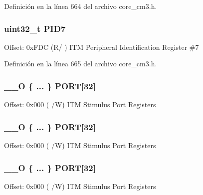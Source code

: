 Definición en la línea 664 del archivo core\+\_\+cm3.\+h.

\subsubsection[{\texorpdfstring{P\+I\+D7}{PID7}}]{ uint32\+\_\+t P\+I\+D7}\hypertarget{struct_i_t_m___type_a247fae2f4a140d4da5e8a044370dedec}{}\label{struct_i_t_m___type_a247fae2f4a140d4da5e8a044370dedec}
Offset\+: 0x\+F\+DC (R/ ) I\+TM Peripheral Identification Register \#7 

Definición en la línea 665 del archivo core\+\_\+cm3.\+h.

\subsubsection[{\texorpdfstring{P\+O\+RT}{PORT}}]{\setlength{\rightskip}{0pt plus 5cm}\+\_\+\+\_\+O \{ ... \}    P\+O\+RT\mbox{[}32\mbox{]}}\hypertarget{struct_i_t_m___type_aa6d310cc8eabd3413456ed2c6d28435e}{}\label{struct_i_t_m___type_aa6d310cc8eabd3413456ed2c6d28435e}
Offset\+: 0x000 ( /W) I\+TM Stimulus Port Registers 
\subsubsection[{\texorpdfstring{P\+O\+RT}{PORT}}]{\setlength{\rightskip}{0pt plus 5cm}\+\_\+\+\_\+O \{ ... \}    P\+O\+RT\mbox{[}32\mbox{]}}\hypertarget{struct_i_t_m___type_a85a40c43c0c3a77535a31a0aefc0fe76}{}\label{struct_i_t_m___type_a85a40c43c0c3a77535a31a0aefc0fe76}
Offset\+: 0x000 ( /W) I\+TM Stimulus Port Registers 
\subsubsection[{\texorpdfstring{P\+O\+RT}{PORT}}]{\setlength{\rightskip}{0pt plus 5cm}\+\_\+\+\_\+O \{ ... \}    P\+O\+RT\mbox{[}32\mbox{]}}\hypertarget{struct_i_t_m___type_a4fb8d5beccf8bf958357bf9d59856f05}{}\label{struct_i_t_m___type_a4fb8d5beccf8bf958357bf9d59856f05}
Offset\+: 0x000 ( /W) I\+TM Stimulus Port Registers 
